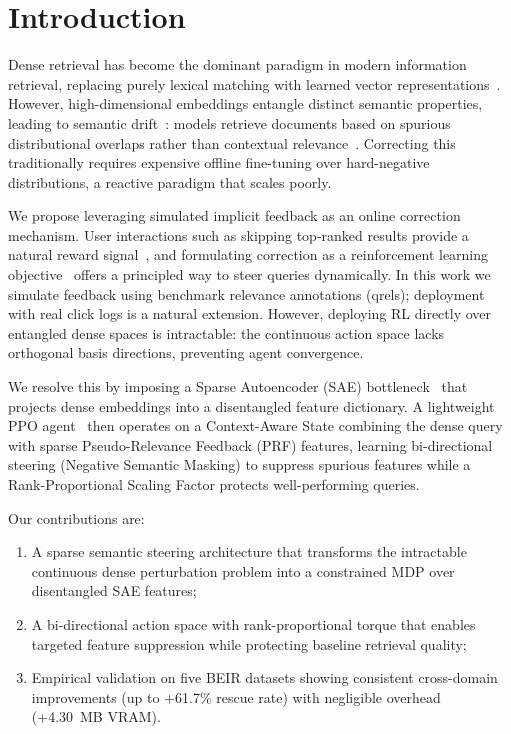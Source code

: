 \documentclass[sigconf]{acmart}
\begin{document}

\maketitle

\section{Introduction}

Dense retrieval has become the dominant paradigm in modern information retrieval, replacing purely lexical matching with learned vector representations~\cite{karpukhin2020, izacard2022}. However, high-dimensional embeddings entangle distinct semantic properties, leading to semantic drift~\cite{zhan2021}: models retrieve documents based on spurious distributional overlaps rather than contextual relevance~\cite{thakur2021}. Correcting this traditionally requires expensive offline fine-tuning over hard-negative distributions, a reactive paradigm that scales poorly.

We propose leveraging simulated implicit feedback as an online correction mechanism. User interactions such as skipping top-ranked results provide a natural reward signal~\cite{joachims2002, afsar2022}, and formulating correction as a reinforcement learning objective~\cite{christiano2017} offers a principled way to steer queries dynamically. In this work we simulate feedback using benchmark relevance annotations (qrels); deployment with real click logs is a natural extension. However, deploying RL directly over entangled dense spaces is intractable: the continuous action space lacks orthogonal basis directions, preventing agent convergence.

We resolve this by imposing a Sparse Autoencoder (SAE) bottleneck~\cite{cunningham2024, elhage2022, bricken2023} that projects dense embeddings into a disentangled feature dictionary. A lightweight PPO agent~\cite{schulman2017} then operates on a Context-Aware State combining the dense query with sparse Pseudo-Relevance Feedback (PRF) features, learning bi-directional steering (Negative Semantic Masking) to suppress spurious features while a Rank-Proportional Scaling Factor protects well-performing queries.

Our contributions are:
\begin{enumerate}
\item A sparse semantic steering architecture that transforms the intractable continuous dense perturbation problem into a constrained MDP over disentangled SAE features;
\item A bi-directional action space with rank-proportional torque that enables targeted feature suppression while protecting baseline retrieval quality;
\item Empirical validation on five BEIR datasets showing consistent cross-domain improvements (up to +61.7\% rescue rate) with negligible overhead (+4.30~MB VRAM).
\end{enumerate}
\end{document}
